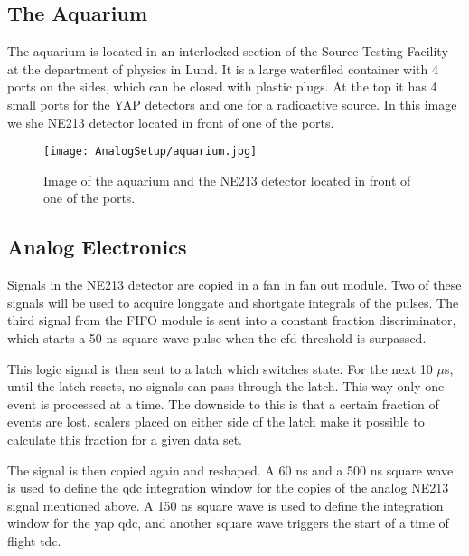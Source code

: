 \documentclass[main.tex]{subfiles}
\begin{document}


\subsection{The Aquarium}
The aquarium is located in an interlocked section of the Source Testing Facility at the department of physics in Lund. It is a large waterfiled container with 4 ports on the sides, which can be closed with plastic plugs. 
At the top it has 4 small ports for the YAP detectors and one for a radioactive source. In this image we she NE213 detector located in front of one of the ports.


\begin{figure}[ht]
	\centering
    	\texttt{[image: AnalogSetup/aquarium.jpg]}
        \caption{Image of the aquarium and the NE213 detector located in front of one of the ports.}
	    \label{fig:aquarium} 
\end{figure}
\newpage

\subsection{Analog Electronics}
Signals in the NE213 detector are copied in a fan in fan out module. Two of these signals will be used to acquire longgate and shortgate integrals of the pulses. The third signal from the FIFO module is sent into a constant fraction discriminator, which starts a 50 ns square wave pulse when the cfd threshold is surpassed. 

This logic signal is then sent to a latch which switches state. For the next 10 $\mu$s, until the latch resets, no signals can pass through the latch. This way only one event is processed at a time. The downside to this is that a certain fraction of events are lost. scalers placed on either side of the latch make it possible to calculate this fraction for a given data set.

The signal is then copied again and reshaped. A 60 ns and a 500 ns square wave is used to define the qdc integration window for the copies of the analog NE213 signal mentioned above. A 150 ns square wave is used to define the integration window for the yap qdc, and another square wave triggers the start of a time of flight tdc.
\end{document}
